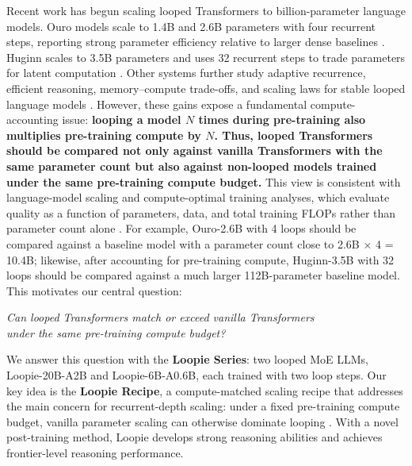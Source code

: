 Recent work has begun scaling looped Transformers to billion-parameter language models. Ouro models scale to 1.4B and 2.6B parameters with four recurrent steps, reporting strong parameter efficiency relative to larger dense baselines \citep{zhu2025scalinglatent}. Huginn scales to 3.5B parameters and uses 32 recurrent steps to trade parameters for latent computation \citep{geiping2025scalinglatent}. Other systems further study adaptive recurrence, efficient reasoning, memory--compute trade-offs, and scaling laws for stable looped language models \citep{bay2025mixture,jeddi2026loopformer,frey2026adaptive,prairie2026parcae}. However, these gains expose a fundamental compute-accounting issue: \textbf{looping a model $N$ times during pre-training also multiplies pre-training compute by $N$. Thus, looped Transformers should be compared not only against vanilla Transformers with the same parameter count but also against non-looped models trained under the same pre-training compute budget.} This view is consistent with language-model scaling and compute-optimal training analyses, which evaluate quality as a function of parameters, data, and total training FLOPs rather than parameter count alone \citep{kaplan2020scaling,hoffmann2022training,prairie2026parcae}. For example, Ouro-2.6B with 4 loops should be compared against a baseline model with a parameter count close to 2.6B × 4 = 10.4B; likewise, after accounting for pre-training compute, Huginn-3.5B with 32 loops should be compared against a much larger 112B-parameter baseline model. This motivates our central question:

\begin{tcolorbox}[colback=ai2offwhite,colframe=ai2pink,boxrule=0.5pt,arc=3pt,left=6pt,right=6pt,top=5pt,bottom=5pt]
\centering
\emph{Can looped Transformers match or exceed vanilla Transformers \\
under the same pre-training compute budget?}
\end{tcolorbox}

We answer this question with the \textbf{Loopie Series}: two looped MoE LLMs, Loopie-20B-A2B and Loopie-6B-A0.6B, each trained with two loop steps. Our key idea is the \textbf{Loopie Recipe}, a compute-matched scaling recipe that addresses the main concern for recurrent-depth scaling: under a fixed pre-training compute budget, vanilla parameter scaling can otherwise dominate looping \citep{hoffmann2022training,prairie2026parcae}. With a novel post-training method, Loopie develops strong reasoning abilities and achieves frontier-level reasoning performance.

